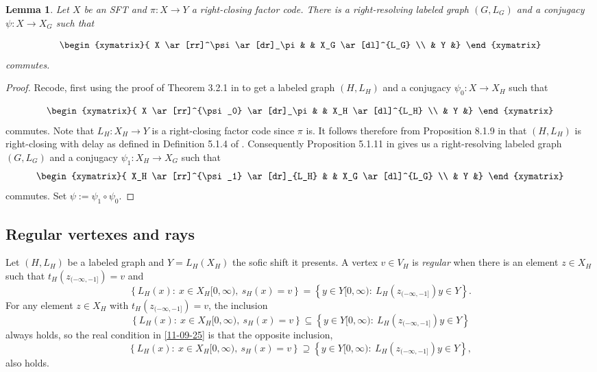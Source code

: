 \documentclass[12pt,oneside,english]{amsart}
\newtheorem{lemma}[thm]{Lemma}
\begin{document}
\begin{lemma}\label{05-05-25x} Let $X$ be an SFT and $\pi : X \to Y$ a right-closing factor code. There is a right-resolving labeled graph $(G,L_G)$ and a conjugacy $\psi : X \to X_G$ such that

\begin{equation*}
\begin{xymatrix}{
 X \ar[rr]^\psi \ar[dr]_\pi & & X_G \ar[dl]^{L_G} \\
 & Y &}
\end{xymatrix}
\end{equation*}
commutes.
\end{lemma}
\begin{proof} Recode, first using the proof of Theorem 3.2.1 in \cite{LM} to get a labeled graph $(H,L_H)$ and a conjugacy $\psi_0 : X \to X_H$ such that

\begin{equation*}
\begin{xymatrix}{
 X \ar[rr]^{\psi_0} \ar[dr]_\pi & & X_H \ar[dl]^{L_H} \\
 & Y &}
\end{xymatrix}
\end{equation*}
commutes. Note that $L_H : X_H \to Y$ is a right-closing factor code since $\pi$ is. It follows therefore from Proposition 8.1.9 in \cite{LM} that $(H,L_H)$ is right-closing with delay as defined in Definition 5.1.4 of \cite{LM}.  Consequently Proposition 5.1.11 in \cite{LM} gives us a right-resolving labeled graph $(G,L_G)$ and a conjugacy $\psi_1 : X_H \to X_G$ such that
\begin{equation*}
\begin{xymatrix}{
 X_H \ar[rr]^{\psi_1} \ar[dr]_{L_H} & & X_G \ar[dl]^{L_G} \\
 & Y &}
\end{xymatrix}
\end{equation*}
commutes. Set $\psi :=  \psi_1 \circ \psi_0$.

\end{proof}



\subsection{Regular vertexes and rays}\label{rays} 

Let $(H,L_H)$ be a labeled graph and $Y = L_H(X_H)$ the sofic shift it presents. A vertex $v \in V_H$ is \emph{regular} when there is an element $z \in X_H$ such that $t_H(z_{(-\infty,-1]}) = v$ and 
\begin{equation}\label{11-09-25}
 \left\{ L_H(x) : \ x \in X_H{[0,\infty)}, \ s_H(x) = v \right\} = \left\{y \in Y[0,\infty) : \ L_H(z_{(-\infty,-1]})y \in Y \right\} .
\end{equation}
For any element $z \in X_H$ with $t_H(z_{(-\infty,-1]}) = v$, the inclusion 
$$
\left\{ L_H(x) : \ x \in X_H{[0,\infty)}, \ s_H(x) = v \right\} \subseteq \left\{y \in Y[0,\infty) : \ L_H(z_{(-\infty,-1]})y \in Y \right\}
$$ 
always holds, so the real condition in \eqref{11-09-25} is that the opposite inclusion,
$$
\left\{ L_H(x) : \ x \in X_H{[0,\infty)}, \ s_H(x) = v \right\} \supseteq \left\{y \in Y[0,\infty) : \ L_H(z_{(-\infty,-1]})y \in Y \right\},
$$ 
also holds. 
\end{document}
